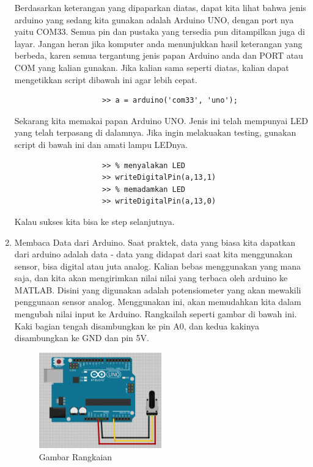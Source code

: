 \begin{enumerate}
				Berdasarkan keterangan yang dipaparkan diatas, dapat kita lihat bahwa jenis arduino yang sedang kita gunakan adalah Arduino UNO, dengan port nya yaitu COM33. Semua pin dan pustaka yang tersedia pun ditampilkan juga di layar. Jangan heran jika komputer anda menunjukkan hasil keterangan yang berbeda, karen semua tergantung jenis papan Arduino anda dan PORT atau COM yang kalian gunakan. Jika kalian sama seperti diatas, kalian dapat mengetikkan script dibawah ini agar lebih cepat.
				
				\begin{verbatim}
					>> a = arduino('com33', 'uno');
				\end{verbatim}
				
				Sekarang kita memakai papan Arduino UNO. Jenis ini telah mempunyai LED  yang telah terpasang di dalamnya. Jika ingin melakuakan testing, gunakan script di bawah ini dan amati lampu LEDnya.
				
				\begin{verbatim}
					>> % menyalakan LED
					>> writeDigitalPin(a,13,1)
					>> % memadamkan LED
					>> writeDigitalPin(a,13,0)
				\end{verbatim}
				
				Kalau sukses kita bisa ke step selanjutnya.
				
			\item Membaca Data dari Arduino.
				Saat praktek, data yang biasa kita dapatkan dari arduino adalah data - data yang didapat dari saat kita menggunakan sensor, bisa digital atau juta analog. Kalian bebas menggunakan yang mana saja, dan kita akan mengirimkan nilai nilai yang terbaca oleh arduino ke MATLAB. Disini yang digunakan adalah potensiometer yang akan mewakili penggunaan sensor analog. Menggunakan ini, akan memudahkan kita dalam mengubah nilai input ke Arduino. Rangkailah seperti gambar di bawah ini. Kaki bagian tengah disambungkan ke pin A0, dan kedua kakinya disambungkan ke GND dan pin 5V.
				
				\begin{figure}[ht]
					\centerline{\includegraphics[width=0.5\textwidth]{figures/arduino.png}}
					\caption{Gambar Rangkaian}
					\label{arduino}
				\end{figure}
				

\end{enumerate}
